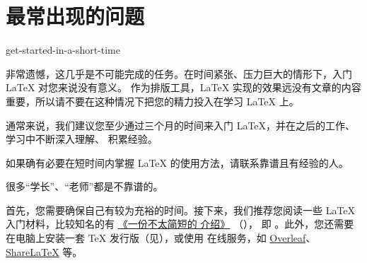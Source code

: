 %
%
%
%


\section{最常出现的问题}
\label{sec:starter}

%
  {get-started-in-a-short-time}

非常遗憾，这几乎是不可能完成的任务。在时间紧张、压力巨大的情形下，入门 \LaTeX{} 对您来说没有意义。
作为排版工具，\LaTeX{} 实现的效果远没有文章的内容重要，所以请不要在这种情况下把您的精力投入在学习
\LaTeX{} 上。

通常来说，我们建议您至少通过三个月的时间来入门 \LaTeX{}，并在之后的工作、学习中不断深入理解、
积累经验。

如果确有必要在短时间内掌握 \LaTeX{} 的使用方法，请联系靠谱且有经验的人。

\begin{note}
  很多“学长”、“老师”都是不靠谱的。
\end{note}



首先，您需要确保自己有较为充裕的时间。接下来，我们推荐您阅读一些 \LaTeX{} 入门材料，比较知名的有
\href{http://mirrors.ctan.org/info/lshort/chinese/lshort-zh-cn.pdf}{《一份不太简短的 \LaTeXe{} 介绍》}
（\href{http://mirrors.ctan.org/info/lshort/english/lshort.pdf}{}），
即 。此外，您还需要在电脑上安装一套 \TeX{} 发行版（见），或使用
在线服务，如 \href{https://www.overleaf.com/}{Overleaf}、
\href{https://www.sharelatex.com}{ShareLaTeX} 等。

